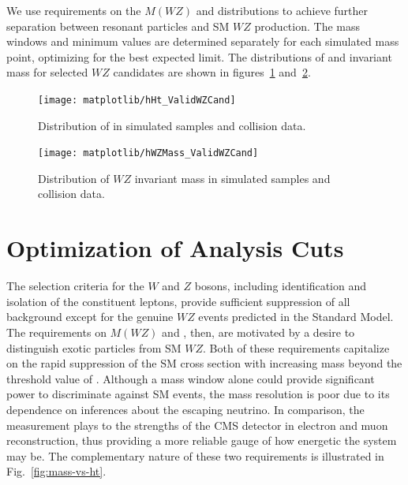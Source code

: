 

We use requirements on the $M(WZ)$ and \lepht distributions to achieve further separation between resonant particles and SM $WZ$ production.  The mass windows and minimum \lepht values are determined separately for each simulated mass point, optimizing for the best expected limit.  The distributions of \lepht and invariant mass for selected $WZ$ candidates are shown in figures~\ref{fig:ht} and~\ref{fig:mwz}.

\begin{figure}
  \centering
  \texttt{[image: matplotlib/hHt\_ValidWZCand]}
  \caption{Distribution of \lepht in simulated samples and collision data.}
  \label{fig:ht}
\end{figure}

\begin{figure}
  \centering
  \texttt{[image: matplotlib/hWZMass\_ValidWZCand]}
  \caption{Distribution of $WZ$ invariant mass in simulated samples and collision data.}
  \label{fig:mwz}
\end{figure}

\section{Optimization of Analysis Cuts}
The selection criteria for the $W$ and $Z$ bosons, including identification and isolation of the constituent leptons, provide sufficient suppression of all background except for the genuine $WZ$ events predicted in the Standard Model.  The requirements on $M(WZ)$ and \lepht, then, are motivated by a desire to distinguish exotic particles from SM $WZ$.  Both of these requirements capitalize on the rapid suppression of the SM cross section with increasing mass beyond the threshold value of .  Although a mass window alone could provide significant power to discriminate against SM events, the mass resolution is poor due to its dependence on inferences about the escaping neutrino.  In comparison, the \lepht measurement plays to the strengths of the CMS detector in electron and muon reconstruction, thus providing a more reliable gauge of how energetic the system may be.  The complementary nature of these two requirements is illustrated in Fig.~\ref{fig:mass-vs-ht}.

